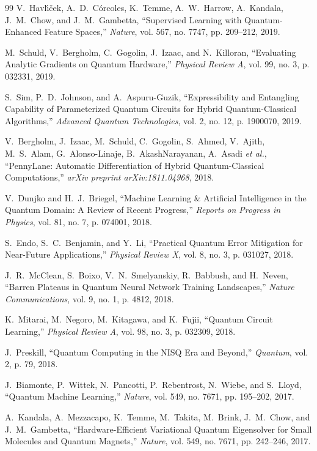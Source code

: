 \documentclass[journal]{IEEEtran}
\begin{document}
\begin{thebibliography}{99}
V.~Havl{\'\i}{\v{c}}ek, A.~D.~C{\'o}rcoles, K.~Temme,
A.~W.~Harrow, A.~Kandala, J.~M.~Chow, and J.~M.~Gambetta,
``Supervised Learning with Quantum-Enhanced Feature Spaces,''
\emph{Nature}, vol. 567, no. 7747,
pp. 209--212, 2019.

M.~Schuld, V.~Bergholm, C.~Gogolin, J.~Izaac,
and N.~Killoran,
``Evaluating Analytic Gradients on Quantum Hardware,''
\emph{Physical Review A}, vol. 99, no. 3,
p. 032331, 2019.

S.~Sim, P.~D.~Johnson, and A.~Aspuru-Guzik,
``Expressibility and Entangling Capability of Parameterized Quantum Circuits for Hybrid Quantum-Classical Algorithms,''
\emph{Advanced Quantum Technologies}, vol. 2, no. 12,
p. 1900070, 2019.

V.~Bergholm, J.~Izaac, M.~Schuld, C.~Gogolin, S.~Ahmed,
V.~Ajith, M.~S.~Alam, G.~Alonso-Linaje,
B.~AkashNarayanan, A.~Asadi \emph{et al.},
``PennyLane: Automatic Differentiation of Hybrid Quantum-Classical Computations,''
\emph{arXiv preprint arXiv:1811.04968}, 2018.

V.~Dunjko and H.~J.~Briegel,
``Machine Learning \& Artificial Intelligence in the Quantum Domain:
A Review of Recent Progress,''
\emph{Reports on Progress in Physics}, vol. 81, no. 7,
p. 074001, 2018.

S.~Endo, S.~C.~Benjamin, and Y.~Li,
``Practical Quantum Error Mitigation for Near-Future Applications,''
\emph{Physical Review X}, vol. 8, no. 3,
p. 031027, 2018.

J.~R.~McClean, S.~Boixo, V.~N.~Smelyanskiy,
R.~Babbush, and H.~Neven,
``Barren Plateaus in Quantum Neural Network Training Landscapes,''
\emph{Nature Communications}, vol. 9, no. 1,
p. 4812, 2018.

K.~Mitarai, M.~Negoro, M.~Kitagawa, and K.~Fujii,
``Quantum Circuit Learning,''
\emph{Physical Review A}, vol. 98, no. 3,
p. 032309, 2018.

J.~Preskill,
``Quantum Computing in the NISQ Era and Beyond,''
\emph{Quantum}, vol. 2, p. 79, 2018.

J.~Biamonte, P.~Wittek, N.~Pancotti, P.~Rebentrost,
N.~Wiebe, and S.~Lloyd,
``Quantum Machine Learning,''
\emph{Nature}, vol. 549, no. 7671,
pp. 195--202, 2017.

A.~Kandala, A.~Mezzacapo, K.~Temme, M.~Takita,
M.~Brink, J.~M.~Chow, and J.~M.~Gambetta,
``Hardware-Efficient Variational Quantum Eigensolver for Small Molecules and Quantum Magnets,''
\emph{Nature}, vol. 549, no. 7671,
pp. 242--246, 2017.


\end{thebibliography}
\end{document}
